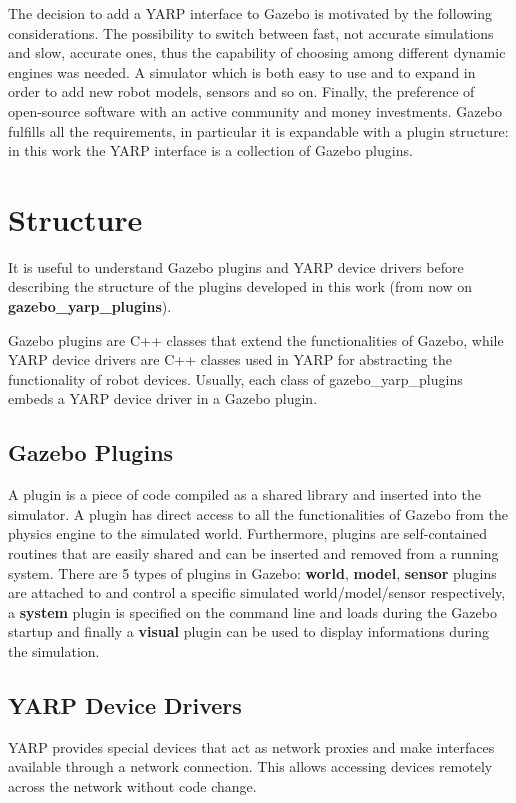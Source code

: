The decision to add a YARP interface to Gazebo is motivated by the following considerations.
The possibility to switch between fast, not accurate simulations and slow, accurate ones, thus the capability of choosing among different dynamic engines was needed. A simulator which is both easy to use and to expand in order to add new robot models, sensors and so on. Finally, the preference of open-source software with an active community and money investments.
Gazebo fulfills all the requirements, in particular it is expandable with a plugin structure: in this work the YARP interface is a collection of Gazebo plugins. 


\section{Structure}
\label{sec:robotics-simulation:structure}
It is useful to understand Gazebo plugins and YARP device drivers before describing the structure of the plugins developed in this work (from now on \textbf{gazebo\_yarp\_plugins}).

Gazebo plugins are C++ classes that extend the functionalities of Gazebo, while YARP device drivers are C++ classes used in YARP for abstracting the functionality of robot devices.
Usually, each class of gazebo\_yarp\_plugins embeds a YARP device driver in a Gazebo plugin. 

\subsection{Gazebo Plugins}
A plugin is a piece of code compiled as a shared library and inserted into the simulator. A plugin has direct access to all the functionalities of Gazebo from the physics engine to the simulated world. Furthermore, plugins are self-contained routines that are easily shared and can be inserted and removed from a running system. There are 5 types of plugins in Gazebo: \textbf{world}, \textbf{model}, \textbf{sensor} plugins are attached to and control a specific simulated world/model/sensor respectively, a \textbf{system} plugin is specified on the command line and loads during the Gazebo startup and finally a \textbf{visual} plugin can be used to display informations during the simulation.


\subsection{YARP Device Drivers}
YARP provides special devices that act as network proxies and make interfaces available through a network connection. This allows accessing devices remotely across the network without code change.

